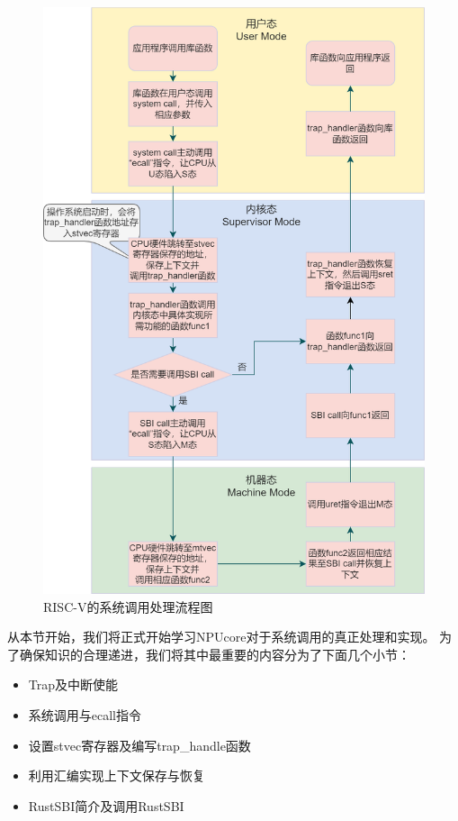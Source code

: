 \begin{figure}[htb]
    \centering
    \includegraphics[width=\textwidth]{figures/03-03-RISC-V的系统调用处理流程图.png}
    \caption{
        RISC-V的系统调用处理流程图
    }
    \label{fig:RISC-V的系统调用处理流程图}
\end{figure}

从本节开始，我们将正式开始学习NPUcore对于系统调用的真正处理和实现。
为了确保知识的合理递进，我们将其中最重要的内容分为了下面几个小节：

\begin{itemize}
    \item Trap及中断使能
    \item 系统调用与ecall指令
    \item 设置stvec寄存器及编写trap_handle函数
    \item 利用汇编实现上下文保存与恢复
    \item RustSBI简介及调用RustSBI
\end{itemize}

